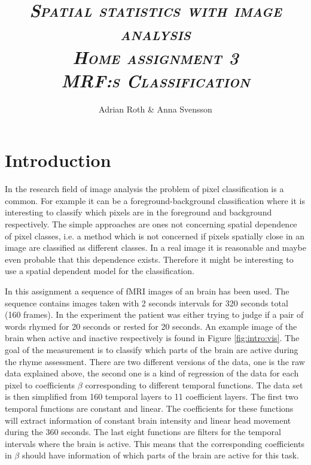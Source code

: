 \documentclass[a4paper,english]{article}
\begin{document}
\afterpage{\cfoot{\thepage}}

\title{\textit{{\textbf{\textsc{Spatial statistics with image analysis  \\ Home assignment 3 \\  MRF:s Classification}}}}}

\author{Adrian Roth \& Anna Svensson}

\maketitle
\thispagestyle{empty}



\pagebreak{}

\thispagestyle{empty}

\pagebreak{}

\section{Introduction}
In the research field of image analysis the problem of pixel classification is a common.
For example it can be a foreground-background classification where it is interesting to classify which pixels are in the foreground and background respectively.
The simple approaches are ones not concerning spatial dependence of pixel classes, i.e. a method which is not concerned if pixels spatially close in an image are classified as different classes.
In a real image it is reasonable and maybe even probable that this dependence exists.
Therefore it might be interesting to use a spatial dependent model for the classification.

In this assignment a sequence of fMRI images of an brain has been used.
The sequence contains images taken with 2 seconds intervals for 320 seconds total (160 frames).
In the experiment the patient was either trying to judge if a pair of words rhymed for 20 seconds or rested for 20 seconds.
An example image of the brain when active and inactive respectively is found in Figure \ref{fig:intro:vis}.
The goal of the measurement is to classify which parts of the brain are active during the rhyme assessment.
There are two different versions of the data, one is the raw data explained above, the second one is a kind of regression of the data for each pixel to coefficients $\beta$ corresponding to different temporal functions.
The data set is then simplified from 160 temporal layers to 11 coefficient layers.
The first two temporal functions are constant and linear.
The coefficients for these functions will extract information of constant brain intensity and linear head movement during the 360 seconds.
The last eight functions are filters for the temporal intervals where the brain is active.
This means that the corresponding coefficients in $\beta$ should have information of which parts of the brain are active for this task.
\end{document}
